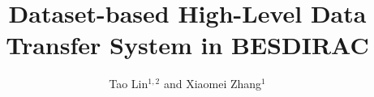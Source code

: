 \documentclass[a4paper]{jpconf}
\begin{document}
\title{Dataset-based High-Level Data Transfer System in BESDIRAC}

\author{Tao Lin$^{1,2}$ and Xiaomei Zhang$^1$}
\address{$^1$ Institute of High Energy Physics, Chinese Academy of Sciences}
\address{$^2$ University of Chinese Academy Sciences}












\end{document}
